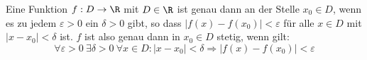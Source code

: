Eine Funktion $f: D \to \R$ mit $D \in \R$ ist genau dann  an der Stelle $x_0 \in D$, wenn es zu jedem $\varepsilon > 0$ ein $\delta > 0$ gibt, so dass $|f(x) - f(x_0)| < \varepsilon$ für alle $x \in D$ mit $|x - x_0| < \delta$ ist.
$f$ ist also genau dann in $x_0 \in D$ stetig, wenn gilt:
$$\forall \varepsilon > 0 \ \exists \delta > 0 \ \forall x \in D : |x - x_0| < \delta \Longrightarrow |f(x) - f(x_0)| < \varepsilon$$